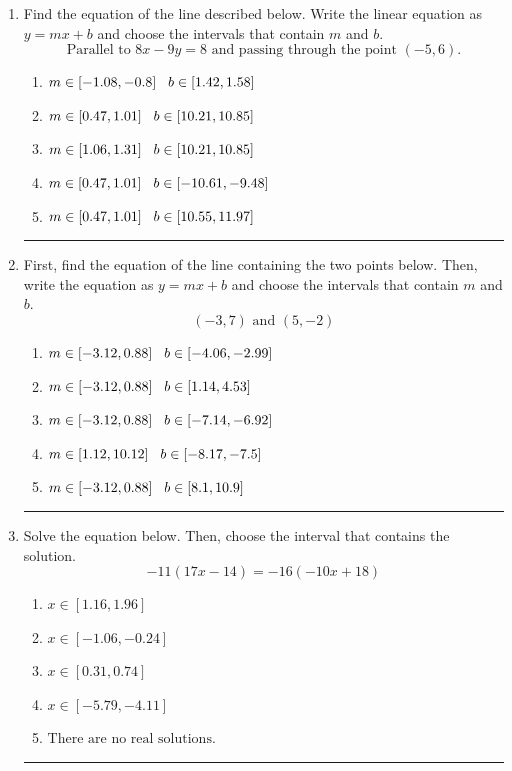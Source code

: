 \documentclass[14pt]{extbook}
\newcommand{\litem}[1]{\item#1\hspace*{-1cm}\rule{\textwidth}{0.4pt}}
\begin{document}
\begin{enumerate}
\litem{
Find the equation of the line described below. Write the linear equation as $ y=mx+b $ and choose the intervals that contain $m$ and $b$.\[ \text{Parallel to } 8 x - 9 y = 8 \text{ and passing through the point } (-5, 6). \]\begin{enumerate}[label=\Alph*.]
\item \( m \in [-1.08, -0.8] \hspace*{3mm} b \in [1.42, 1.58] \)
\item \( m \in [0.47, 1.01] \hspace*{3mm} b \in [10.21, 10.85] \)
\item \( m \in [1.06, 1.31] \hspace*{3mm} b \in [10.21, 10.85] \)
\item \( m \in [0.47, 1.01] \hspace*{3mm} b \in [-10.61, -9.48] \)
\item \( m \in [0.47, 1.01] \hspace*{3mm} b \in [10.55, 11.97] \)

\end{enumerate} }
\litem{
First, find the equation of the line containing the two points below. Then, write the equation as $ y=mx+b $ and choose the intervals that contain $m$ and $b$.\[ (-3, 7) \text{ and } (5, -2) \]\begin{enumerate}[label=\Alph*.]
\item \( m \in [-3.12, 0.88] \hspace*{3mm} b \in [-4.06, -2.99] \)
\item \( m \in [-3.12, 0.88] \hspace*{3mm} b \in [1.14, 4.53] \)
\item \( m \in [-3.12, 0.88] \hspace*{3mm} b \in [-7.14, -6.92] \)
\item \( m \in [1.12, 10.12] \hspace*{3mm} b \in [-8.17, -7.5] \)
\item \( m \in [-3.12, 0.88] \hspace*{3mm} b \in [8.1, 10.9] \)

\end{enumerate} }
\litem{
Solve the equation below. Then, choose the interval that contains the solution.\[ -11(17x -14) = -16(-10x + 18) \]\begin{enumerate}[label=\Alph*.]
\item \( x \in [1.16, 1.96] \)
\item \( x \in [-1.06, -0.24] \)
\item \( x \in [0.31, 0.74] \)
\item \( x \in [-5.79, -4.11] \)
\item \( \text{There are no real solutions.} \)


\end{enumerate}}
\end{enumerate}
\end{document}
